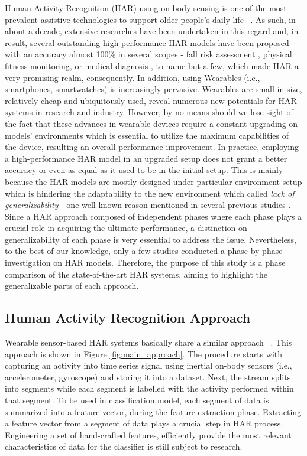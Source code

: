 \documentclass[journal,article,submit,moreauthors,pdftex]{Definitions/mdpi}
\begin{document}
Human Activity Recognition (HAR) using on-body sensing is one of the most prevalent assistive technologies to support older people's daily life ~\cite{wang2019survey}. As such, in about a decade, extensive researches have been undertaken in this regard and, in result, several outstanding high-performance HAR models have been proposed with an accuracy almost 100\% in several scopes - fall risk assessment \cite{sow2013mining}, physical fitness monitoring\cite{morris2014recofit}, or medical diagnosis \cite{gonzalez2015features}, to name but a few, which made HAR a very promising realm, consequently. In addition, using Wearables (i.e., smartphones, smartwatches) is increasingly pervasive. Wearables are small in size, relatively cheap and ubiquitously used, reveal numerous new potentials for HAR systems in research and industry. However, by no means should we lose sight of the fact that these advances in wearable devices require a constant upgrading on models' environments which is essential to utilize the maximum capabilities of the device, resulting an overall performance improvement. In practice, employing a high-performance HAR model in an upgraded setup does not grant a better accuracy or even as equal as it used to be in the initial setup. This is mainly because the HAR models are mostly designed under particular environment setup which is hindering the adaptability to the new environment which called \textit{lack of generalizability} - one well-known reason mentioned in several previous studies \cite{schilit1994context, soro2019recognition, shoaib2016complex}. Since a HAR approach composed of independent phases where each phase plays a crucial role in acquiring the ultimate performance, a distinction on generalizability of each phase is very essential to address the issue. Nevertheless, to the best of our knowledge, only a few studies conducted a phase-by-phase investigation on HAR models. Therefore, the purpose of this study is a phase comparison of the state-of-the-art HAR systems, aiming to highlight the generalizable parts of each approach.\\

\subsection{Human Activity Recognition Approach}
Wearable sensor-based HAR systems basically share a similar approach ~\cite{s140610146}. This approach is shown in Figure \ref{fig:main_approach}. The procedure starts with capturing an activity into time series signal using inertial on-body sensors (i.e., accelerometer, gyroscope) and storing it into a dataset. Next, the stream splits into segments while each segment is labelled with the activity performed within that segment. To be used in classification model, each segment of data is summarized into a feature vector, during the feature extraction phase. Extracting a feature vector from a segment of data plays a crucial step in HAR process. Engineering a set of hand-crafted features, efficiently provide the most relevant characteristics of data for the classifier is still subject to research. 
\end{document}

